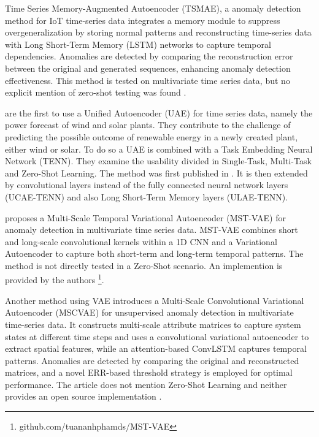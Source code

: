 Time Series Memory-Augmented Autoencoder (TSMAE), a anomaly detection method for IoT time-series data integrates a memory module to suppress overgeneralization by storing normal patterns and reconstructing time-series data with Long Short-Term Memory (LSTM) networks to capture temporal dependencies. Anomalies are detected by comparing the reconstruction error between the original and generated sequences, enhancing anomaly detection effectiveness. This method is tested on multivariate time series data, but no explicit mention of zero-shot testing was found \cite{gao_tsmae_2023}.

\cite{nivarthi_multi-task_2023} are the first to use a Unified Autoencoder (UAE) for time series data, namely the power forecast of wind and solar plants. They contribute to the challenge of predicting the possible outcome of renewable energy in a newly created plant, either wind or solar. To do so a UAE is combined with a Task Embedding Neural Network (TENN). They examine the usability divided in Single-Task, Multi-Task and Zero-Shot Learning. The method was first published in \cite{nivarthi_unified_2022}. It is then extended by convolutional layers instead of the fully connected neural network layers (UCAE-TENN) and also Long Short-Term Memory layers (ULAE-TENN).

\cite{pham_mst-vae_2022} proposes a Multi-Scale Temporal Variational Autoencoder (MST-VAE) for anomaly detection in multivariate time series data. MST-VAE combines short and long-scale convolutional kernels within a 1D CNN and a Variational Autoencoder to capture both short-term and long-term temporal patterns. The method is not directly tested in a Zero-Shot scenario. An implemention is provided by the authors \footnote{\fussy\tiny github.com/tuananhphamds/MST-VAE}.

Another method using VAE introduces a Multi-Scale Convolutional Variational Autoencoder (MSCVAE) for unsupervised anomaly detection in multivariate time-series data. It constructs multi-scale attribute matrices to capture system states at different time steps and uses a convolutional variational autoencoder to extract spatial features, while an attention-based ConvLSTM captures temporal patterns. Anomalies are detected by comparing the original and reconstructed matrices, and a novel ERR-based threshold strategy is employed for optimal performance. The article does not mention Zero-Shot Learning and neither provides an open source implementation \cite{yookampon_robust_2022}.

